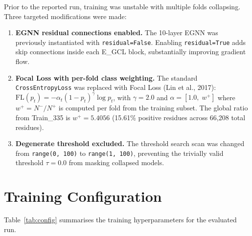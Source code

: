 \documentclass[11pt,a4paper]{article}
\begin{document}
Prior to the reported run, training was unstable with multiple folds collapsing.
Three targeted modifications were made:
\begin{enumerate}
    \item \textbf{EGNN residual connections enabled.} The 10-layer EGNN was
          previously instantiated with \texttt{residual=False}. Enabling
          \texttt{residual=True} adds skip connections inside each E\_GCL block,
          substantially improving gradient flow.
    \item \textbf{Focal Loss with per-fold class weighting.}
          The standard \texttt{CrossEntropyLoss} was replaced with Focal Loss
          (Lin et al., 2017):
          $\mathrm{FL}(p_t) = -\alpha_t(1-p_t)^\gamma \log p_t$,
          with $\gamma = 2.0$ and $\alpha = [1.0,\; w^+]$ where
          $w^+ = N^-/N^+$ is computed per fold from the training subset.
          The global ratio from Train\_335 is $w^+ = 5.4056$ (15.61\% positive
          residues across 66{,}208 total residues).
    \item \textbf{Degenerate threshold excluded.} The threshold search scan was
          changed from \texttt{range(0, 100)} to \texttt{range(1, 100)}, preventing
          the trivially valid threshold $\tau = 0.0$ from masking collapsed models.
\end{enumerate}

\section{Training Configuration}

Table~\ref{tab:config} summarises the training hyperparameters for the evaluated run.
\end{document}
